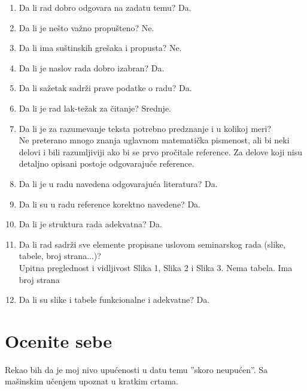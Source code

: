 \documentclass[a4paper]{report}
\begin{document}
\begin{enumerate}
\item Da li rad dobro odgovara na zadatu temu? Da.\\ 
\item Da li je nešto važno propušteno? Ne.\\
\item Da li ima suštinskih grešaka i propusta? Ne.\\
\item Da li je naslov rada dobro izabran? Da.\\
\item Da li sažetak sadrži prave podatke o radu?  Da.\\
\item Da li je rad lak-težak za čitanje?  Srednje.\\
\item Da li je za razumevanje teksta potrebno predznanje i u kolikoj meri?\\ Ne
preterano mnogo znanja uglavnom matematička pismenost, ali bi neki delovi i bili razumljiviji ako bi se prvo pročitale reference. Za
delove koji nisu detaljno opisani postoje odgovarajuće reference.\\
\item Da li je u radu navedena odgovarajuća literatura?  Da.\\
\item Da li su u radu reference korektno navedene?  Da.\\
\item Da li je struktura rada adekvatna?  Da.\\
\item Da li rad sadrži sve elemente propisane uslovom seminarskog rada (slike, tabele, broj strana...)?\\
Upitna preglednost i vidljivost Slika 1, Slika 2 i Slika 3. Nema tabela. Ima broj strana\\
\item Da li su slike i tabele funkcionalne i adekvatne? Da.\\
\end{enumerate}

\section{Ocenite sebe}
Rekao bih da je moj nivo upućenosti u datu temu ”skoro neupućen”.
Sa mašinskim učenjem upoznat u kratkim crtama. 
\end{document}
